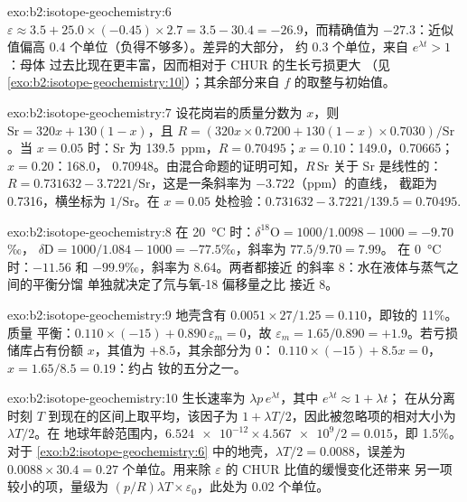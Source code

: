 \begin{solution}{exo:b2:isotope-geochemistry:6}
$\varepsilon \approx 3.5 + 25.0\times(-0.45)\times2.7 = 3.5 - 30.4 = -26.9$，而精确值为
$-27.3$：近似值偏高 0.4 个单位（负得不够多）。差异的大部分，
约 0.3 个单位，来自 $e^{\lambda t} > 1$：母体
过去比现在更丰富，因而相对于 CHUR 的生长亏损更大
（见\cref{exo:b2:isotope-geochemistry:10}）；其余部分来自 $f$ 的取整与初始值。
\end{solution}

\begin{solution}{exo:b2:isotope-geochemistry:7}
设花岗岩的质量分数为 $x$，则 $\mathrm{Sr} = 320x + 130(1-x)$，且
$R = (320x\times0.7200 + 130(1-x)\times0.7030)/\mathrm{Sr}$。当 $x = 0.05$ 时：Sr
为 \qty{139.5}{ppm}，$R = 0.70495$；$x = 0.10$：149.0，0.70665；$x = 0.20$：168.0，
0.70948。由混合命题的证明可知，$R\,\mathrm{Sr}$ 关于 Sr 是线性的：
$R = 0.731632 - 3.7221/\mathrm{Sr}$，这是一条斜率为 $-3.722$（ppm）的直线，
截距为 0.7316，横坐标为 $1/\mathrm{Sr}$。在 $x = 0.05$ 处检验：$0.731632 - 3.7221/139.5
= 0.70495$.
\end{solution}

\begin{solution}{exo:b2:isotope-geochemistry:8}
在 \qty{20}{\degreeCelsius} 时：$\delta^{18}\mathrm{O} = 1000/1.0098 - 1000 = -9.70$‰，
$\delta\mathrm{D} = 1000/1.084 - 1000 = -77.5$‰，斜率为 $77.5/9.70 = 7.99$。
在 \qty{0}{\degreeCelsius} 时：$-11.56$ 和 $-99.9$‰，斜率为 8.64。两者都接近
的斜率 8：水在液体与蒸气之间的平衡分馏
单独就决定了氘与氧-18 偏移量之比
接近 8。
\end{solution}

\begin{solution}{exo:b2:isotope-geochemistry:9}
地壳含有 $0.0051\times27/1.25 = 0.110$，即钕的 11\%。质量
平衡：$0.110\times(-15) + 0.890\,\varepsilon_m = 0$，故 $\varepsilon_m = 1.65/0.890 =
+1.9$。若亏损储库占有份额 $x$，其值为 $+8.5$，其余部分为 0：
$0.110\times(-15) + 8.5x = 0$，$x = 1.65/8.5 = 0.19$：约占
钕的五分之一。
\end{solution}

\begin{solution}{exo:b2:isotope-geochemistry:10}
生长速率为 $\lambda p\,e^{\lambda t}$，其中 $e^{\lambda t} \approx 1 + \lambda t$；
在从分离时刻 $T$ 到现在的区间上取平均，该因子为
$1 + \lambda T/2$，因此被忽略项的相对大小为 $\lambda T/2$。在
地球年龄范围内，$\num{6.524e-12}\times\num{4.567e9}/2 = 0.015$，即 1.5\%。对于
\cref{exo:b2:isotope-geochemistry:6} 中的地壳，$\lambda T/2 = 0.0088$，误差为 $0.0088\times30.4 = 0.27$
个单位。用来除 $\varepsilon$ 的 CHUR 比值的缓慢变化还带来
另一项较小的项，量级为 $(p/R)\lambda T \times \varepsilon_0$，此处为 0.02 个单位。
\end{solution}

